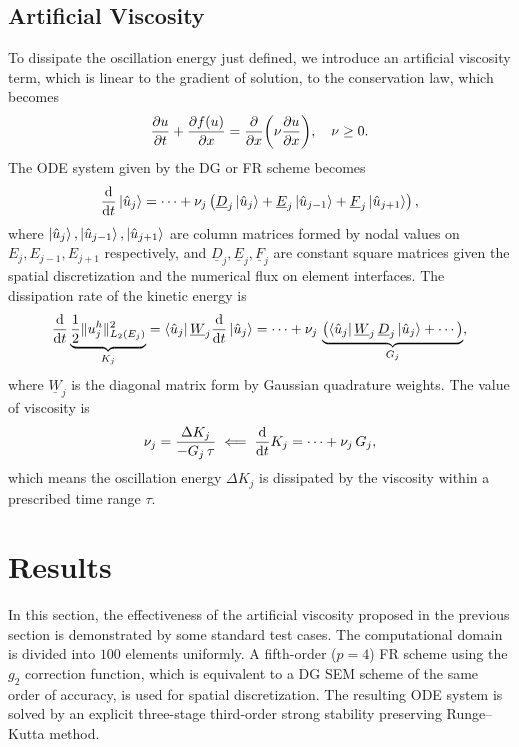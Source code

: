 \documentclass[10pt,draft]{article}
\begin{document}
\subsection{Artificial Viscosity}
To dissipate the oscillation energy just defined, we introduce an artificial viscosity term, which is linear to the gradient of solution, to the conservation law, which becomes
$$
\pdv{u}{t}+\pdv{f(u)}{x}=\pdv{x}\qty(\nu\pdv{u}{x}),\quad \nu \ge 0.
$$
The ODE system given by the DG or FR scheme becomes
$$
\dv{t}\ket{\hat{u}_{j}}=\cdots+\nu_{j}\left(\underline{D}_{j}\ket{\hat{u}_{j}}+\underline{E}_{j}\ket{\hat{u}_{j-1}}+\underline{F}_{j}\ket{\hat{u}_{j+1}}\right),
$$
where $\ket{\hat{u}_{j}}, \ket{\hat{u}_{j-1}}, \ket{\hat{u}_{j+1}}$ are column matrices formed by nodal values on $E_{j}, E_{j-1}, E_{j+1}$ respectively, and $ \underline{D}_{j}, \underline{E}_{j}, \underline{F}_{j} $ are constant square matrices given the spatial discretization and the numerical flux on element interfaces.
The dissipation rate of the kinetic energy is
$$
\dv{t}\underbrace{\frac{1}{2}\Vert u_{j}^{h}\Vert_{L_{2}(E_{j})}^{2}}_{K_{j}}=\bra{\hat{u}_{j}}\underline{W}_{j}\dv{t}\ket{\hat{u}_{j}}=\cdots+\nu_{j}\,\underbrace{\left(\bra{\hat{u}_{j}}\underline{W}_{j}\,\underline{D}_{j}\ket{\hat{u}_{j}}+\cdots\right)}_{G_{j}},
$$
where $\underline{W}_{j}$ is the diagonal matrix form by Gaussian quadrature weights.
The value of viscosity is
$$
\nu_{j}=\frac{\Delta K_{j}}{-G_{j}\,\tau}\impliedby\dv{t}K_{j}=\cdots+\nu_{j}\,G_{j},
$$
which means the oscillation energy $\Delta K_{j}$ is dissipated by the viscosity within a prescribed time range $\tau$.

\section{Results}
In this section, the effectiveness of the artificial viscosity proposed in the previous section is demonstrated by some standard test cases.
The computational domain is divided into $100$ elements uniformly.
A fifth-order ($p=4$) FR scheme using the $g_2$ correction function, which is equivalent to a DG SEM scheme of the same order of accuracy, is used for spatial discretization.
The resulting ODE system is solved by an explicit three-stage third-order strong stability preserving Runge--Kutta method.
\end{document}
